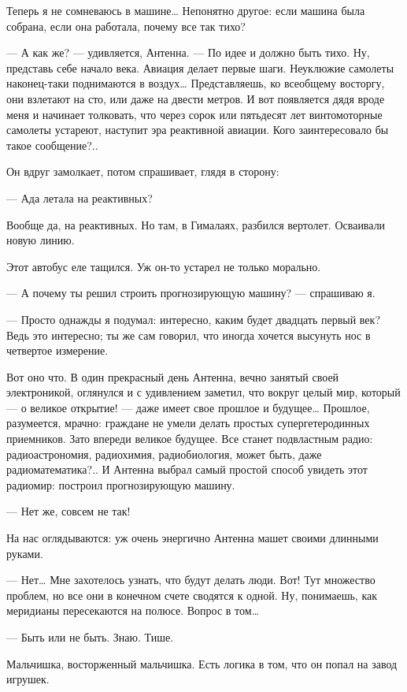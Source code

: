 Теперь я  не  сомневаюсь в  машине…  Непонятно другое:  если  машина  была
собрана, если она работала, почему все так тихо?

— А как  же? —  удивляется, Антенна.  — По идее  и должно  быть тихо.  Ну,
представь себе начало века. Авиация делает первые шаги. Неуклюжие самолеты
наконец-таки поднимаются в воздух…  Представляешь, ко всеобщему  восторгу,
они взлетают на  сто, или  даже на двести  метров. И  вот появляется  дядя
вроде меня  и  начинает  толковать,  что через  сорок  или  пятьдесят  лет
винтомоторные самолеты  устареют, наступит  эра реактивной  авиации.  Кого
заинтересовало бы такое сообщение?..

Он вдруг замолкает, потом спрашивает, глядя в сторону:

— Ада летала на реактивных?

Вообще да, на реактивных. Но там, в Гималаях, разбился вертолет. Осваивали
новую линию.

Этот автобус еле тащился. Уж он-то устарел не только морально.

— А почему ты решил строить прогнозирующую машину? — спрашиваю я.

— Просто однажды я  подумал: интересно, каким  будет двадцать первый  век?
Ведь это интересно; ты же сам  говорил, что иногда хочется высунуть нос  в
четвертое измерение.

Вот  оно  что.  В  один  прекрасный  день  Антенна,  вечно  занятый  своей
электроникой, оглянулся  и с  удивлением заметил,  что вокруг  целый  мир,
который —  о  великое открытие!  —  даже  имеет свое  прошлое  и  будущее…
Прошлое,  разумеется,   мрачно:   граждане   не   умели   делать   простых
супергетеродинных приемников.  Зато впереди  великое будущее.  Все  станет
подвластным радио: радиоастрономия, радиохимия, радиобиология, может быть,
даже радиоматематика?.. И Антенна выбрал самый простой способ увидеть этот
радиомир: построил прогнозирующую машину.

— Нет же, совсем не так!

На нас  оглядываются: уж  очень энергично  Антенна машет  своими  длинными
руками.

— Нет… Мне захотелось  узнать, что будут делать  люди. Вот! Тут  множество
проблем, но все они в конечном счете сводятся к одной. Ну, понимаешь,  как
меридианы пересекаются на полюсе. Вопрос в том…

— Быть или не быть. Знаю. Тише.

Мальчишка, восторженный  мальчишка. Есть  логика в  том, что  он попал  на
завод игрушек.

